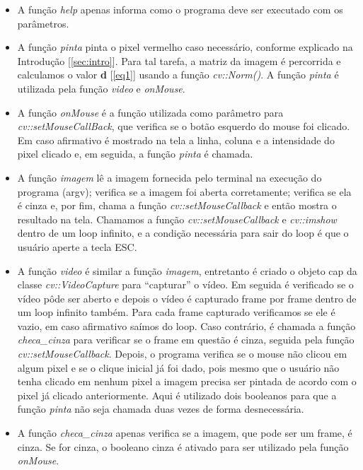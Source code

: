 \documentclass{bmvc2k}
\begin{document}
\begin{itemize}
\item A função \textit{help} apenas informa como o programa deve ser executado com os parâmetros.
\item A função \textit{pinta} pinta o pixel vermelho caso necessário, conforme explicado na Introdução [\ref{sec:intro}]. Para tal tarefa, a matriz da imagem é percorrida e calculamos o valor \textbf{d} [\ref{eq1}] usando a função \textit{cv::Norm()}. A função \textit{pinta} é utilizada pela função \textit{video} e \textit{onMouse}.
\item A função \textit{onMouse} é a função utilizada como parâmetro para \textit{cv::setMouseCallBack}, que verifica se o botão esquerdo do mouse foi clicado. Em caso afirmativo é mostrado na tela a linha, coluna e a intensidade do pixel clicado e, em seguida, a função \textit{pinta} é chamada.
\item A função \textit{imagem} lê a imagem fornecida pelo terminal na execução do programa (argv); verifica se a imagem foi aberta corretamente; verifica se ela é cinza e, por fim, chama a função \textit{cv::setMouseCallback} e então mostra o resultado na tela. Chamamos a função \textit{cv::setMouseCallback} e \textit{cv::imshow} dentro de um loop infinito, e a condição necessária para sair do loop é que o usuário aperte a tecla ESC.
\item A função \textit{video} é similar a função \textit{imagem}, entretanto é criado o objeto cap da classe \textit{cv::VideoCapture} para ``capturar'' o vídeo. Em seguida é verificado se o vídeo pôde ser aberto e depois o vídeo é capturado frame por frame dentro de um loop infinito também. Para cada frame capturado verificamos se ele é vazio, em caso afirmativo saímos do loop. Caso contrário, é chamada a função \textit{checa\_cinza} para verificar se o frame em questão é cinza, seguida pela função \textit{cv::setMouseCallback}. Depois, o programa verifica se o mouse não clicou em algum pixel e se o clique inicial já foi dado, pois mesmo que o usuário não tenha clicado em nenhum pixel a imagem precisa ser pintada de acordo com o pixel já clicado anteriormente. Aqui é utilizado dois booleanos para que a função \textit{pinta} não seja chamada duas vezes de forma desnecessária.
\item A função \textit{checa\_cinza} apenas verifica se a imagem, que pode ser um frame, é cinza. Se for cinza, o booleano cinza é ativado para ser utilizado pela função \textit{onMouse}.
\end{itemize}
\end{document}
